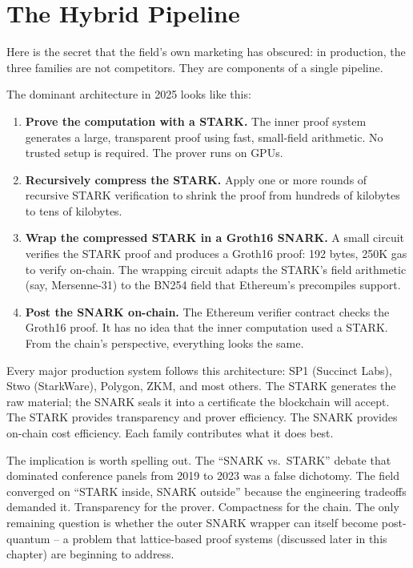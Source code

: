 \documentclass[
  11pt,
  openany]{report}
\renewcommand{\textbf}[1]{{\bfseries\color{MidnightBold}#1}}
\begin{document}
\section{The Hybrid Pipeline}\label{the-hybrid-pipeline}

Here is the secret that the field's own marketing has obscured: in production,
the three families are not competitors. They are components of a single
pipeline.

The dominant architecture in 2025 looks like this:

\begin{enumerate}
\def\labelenumi{\arabic{enumi}.}
\item
  \textbf{Prove the computation with a STARK.} The inner proof system generates
  a large, transparent proof using fast, small-field arithmetic. No trusted
  setup is required. The prover runs on GPUs.
\item
  \textbf{Recursively compress the STARK.} Apply one or more rounds of recursive
  STARK verification to shrink the proof from hundreds of kilobytes to tens of
  kilobytes.
\item
  \textbf{Wrap the compressed STARK in a Groth16 SNARK.} A small circuit
  verifies the STARK proof and produces a Groth16 proof: 192 bytes, 250K gas to
  verify on-chain. The wrapping circuit adapts the STARK's field arithmetic
  (say, Mersenne-31) to the BN254 field that Ethereum's precompiles support.
\item
  \textbf{Post the SNARK on-chain.} The Ethereum verifier contract checks the
  Groth16 proof. It has no idea that the inner computation used a STARK. From
  the chain's perspective, everything looks the same.
\end{enumerate}

Every major production system follows this architecture: SP1 (Succinct Labs),
Stwo (StarkWare), Polygon, ZKM, and most others. The STARK generates the raw
material; the SNARK seals it into a certificate the blockchain will accept. The
STARK provides transparency and prover efficiency. The SNARK provides on-chain
cost efficiency. Each family contributes what it does best.

The implication is worth spelling out. The ``SNARK vs.~STARK'' debate that
dominated conference panels from 2019 to 2023 was a false dichotomy. The field
converged on ``STARK inside, SNARK outside'' because the engineering tradeoffs
demanded it. Transparency for the prover. Compactness for the chain. The only
remaining question is whether the outer SNARK wrapper can itself become
post-quantum -- a problem that lattice-based proof systems (discussed later in
this chapter) are beginning to address.
\end{document}
